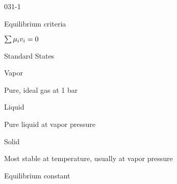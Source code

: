 \begin{mitframe}{031-1}

    
\begin{listone}
        
    \item Equilibrium criteria
    
	\begin{listtwo}

		\item $\sum\chempot_{\state}\vvel_{\state} = 0$
    
    \end{listtwo}
    
    \item Standard States
    
	\begin{listtwo}

		\item Vapor
        
        \begin{listthree}
       
        \item Pure, ideal gas at 1 bar

		\end{listthree}        
        
        \item Liquid

        \begin{listthree}
        
        	\item Pure liquid at vapor pressure

		\end{listthree}
                
        \item Solid
        
        \begin{listthree}
        
        	\item Most stable at temperature, usually at vapor pressure

		\end{listthree}
    
    \end{listtwo}    
   
    \item Equilibrium constant
    
	\begin{listtwo}


\end{listtwo}
\end{listone}
\end{mitframe}

